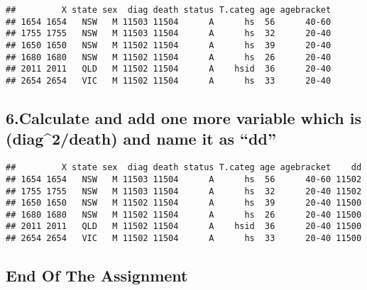 \documentclass[
]{article}
\newenvironment{Shaded}{\begin{snugshade}}{\end{snugshade}}
\newcommand{\DecValTok}[1]{\textcolor[rgb]{0.00,0.00,0.81}{#1}}
\newcommand{\KeywordTok}[1]{\textcolor[rgb]{0.13,0.29,0.53}{\textbf{#1}}}
\newcommand{\NormalTok}[1]{#1}
\newcommand{\OperatorTok}[1]{\textcolor[rgb]{0.81,0.36,0.00}{\textbf{#1}}}
\begin{document}
\begin{Shaded}
\end{Shaded}

\begin{verbatim}
##         X state sex  diag death status T.categ age agebracket
## 1654 1654   NSW   M 11503 11504      A      hs  56      40-60
## 1755 1755   NSW   M 11503 11504      A      hs  32      20-40
## 1650 1650   NSW   M 11502 11504      A      hs  39      20-40
## 1680 1680   NSW   M 11502 11504      A      hs  26      20-40
## 2011 2011   QLD   M 11502 11504      A    hsid  36      20-40
## 2654 2654   VIC   M 11502 11504      A      hs  33      20-40
\end{verbatim}

\hypertarget{calculate-and-add-one-more-variable-which-is-diag2death-and-name-it-as-dd}{%
\subsection{6.Calculate and add one more variable which is
(diag\^{}2/death) and name it as
``dd''}\label{calculate-and-add-one-more-variable-which-is-diag2death-and-name-it-as-dd}}

\begin{Shaded}
\end{Shaded}

\begin{verbatim}
##         X state sex  diag death status T.categ age agebracket    dd
## 1654 1654   NSW   M 11503 11504      A      hs  56      40-60 11502
## 1755 1755   NSW   M 11503 11504      A      hs  32      20-40 11502
## 1650 1650   NSW   M 11502 11504      A      hs  39      20-40 11500
## 1680 1680   NSW   M 11502 11504      A      hs  26      20-40 11500
## 2011 2011   QLD   M 11502 11504      A    hsid  36      20-40 11500
## 2654 2654   VIC   M 11502 11504      A      hs  33      20-40 11500
\end{verbatim}

\hypertarget{end-of-the-assignment}{%
\subsection{End Of The Assignment}\label{end-of-the-assignment}}
\end{document}

